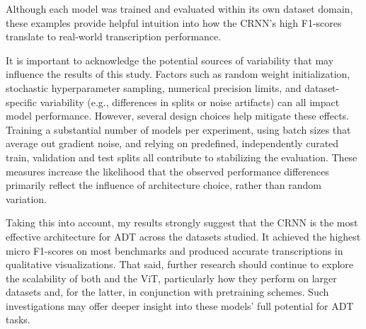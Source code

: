 Although each model was trained and evaluated within its own dataset domain, these examples provide helpful intuition into how the \gls{CRNN}'s high F1-scores translate to real-world transcription performance.

It is important to acknowledge the potential sources of variability that may influence the results of this study. Factors such as random weight initialization, stochastic hyperparameter sampling, numerical precision limits, and dataset-specific variability (e.g., differences in splits or noise artifacts) can all impact model performance. However, several design choices help mitigate these effects. Training a substantial number of models per experiment, using batch sizes that average out gradient noise, and relying on predefined, independently curated train, validation and test splits all contribute to stabilizing the evaluation. These measures increase the likelihood that the observed performance differences primarily reflect the influence of architecture choice, rather than random variation.

Taking this into account, my results strongly suggest that the \acrfull{CRNN} is the most effective architecture for \gls{ADT} across the datasets studied. It achieved the highest micro F1-scores on most benchmarks and produced accurate transcriptions in qualitative visualizations. That said, further research should continue to explore the scalability of both  and the \acrfull{ViT}, particularly how they perform on larger datasets and, for the latter, in conjunction with pretraining schemes. Such investigations may offer deeper insight into these models' full potential for \gls{ADT} tasks.